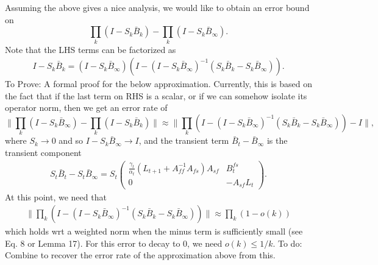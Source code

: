Assuming the above gives a nice analysis, we would like to obtain an error bound on 
\begin{equation}
    \prod_k (I - S_k \bar{B}_k) - \prod_k (I - S_k \bar{B}_\infty) .
\end{equation}
Note that the LHS terms can be factorized as
\begin{align*}
    I - S_k \bar{B}_k = (I - S_k \bar{B}_\infty) (I - (I - S_k \bar{B}_\infty)^{-1}(S_k \bar{B}_k - S_k \bar{B}_\infty)).
\end{align*}
{\color{red}To Prove: A formal proof for the below approximation. 
Currently, this is based on the fact that if the last term on RHS is a scalar, or if we can somehow isolate its operator norm, then we get an error rate of}
\begin{equation}
    \lVert \prod_k (I - S_k \bar{B}_\infty) - \prod_k (I - S_k \bar{B}_k)\rVert \approx \lVert \prod_k \left(I - (I - S_k \bar{B}_\infty)^{-1}(S_k \bar{B}_k - S_k \bar{B}_\infty)\right) - I \rVert,
\end{equation}
where $S_k \to 0$ and so $I - S_k \bar{B}_\infty \to I$, and the transient term $\bar{B}_t - \bar{B}_\infty$ is the transient component
\begin{align*}
    S_t \bar{B}_t - S_t \bar{B}_\infty = S_t \begin{pmatrix}
        \frac{\gamma_t}{\alpha_t}(L_{t+1} + A_{ff}^{-1} A_{fs})A_{sf} & B_t^{fs} \\ 0 & -A_{sf} L_t 
    \end{pmatrix} .
\end{align*}
{\color{red}At this point, we need that}
\begin{align*}
    \lVert \prod_k (I - (I - S_k \bar{B}_\infty)^{-1}(S_k \bar{B}_k - S_k \bar{B}_\infty)) \rVert
        \approx 
    \prod_k (1 - o(k))
\end{align*}
which holds {\color{red}wrt a weighted norm} when the minus term is sufficiently small (see \citet{kaledin2020finite} Eq. 8 or Lemma 17). 
For this error to decay to 0, we need $o(k) \leq 1/k$.
{\color{red}To do: Combine to recover the error rate of the approximation above from this.}



